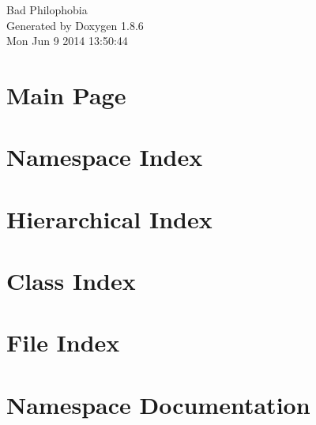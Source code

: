 \documentclass[twoside]{book}
\newcommand{\clearemptydoublepage}{%
  \newpage{\pagestyle{empty}\cleardoublepage}%
}
\begin{document}
\hypersetup{pageanchor=false}
\begin{titlepage}
\vspace*{7cm}
\begin{center}%
{\Large Bad Philophobia }\\
\vspace*{1cm}
{\large Generated by Doxygen 1.8.6}\\
\vspace*{0.5cm}
{\small Mon Jun 9 2014 13:50:44}\\
\end{center}
\end{titlepage}
\clearemptydoublepage
\tableofcontents
\clearemptydoublepage
{}
\hypersetup{pageanchor=true}

\chapter{Main Page}
\label{index}\hypertarget{index}{}
\chapter{Namespace Index}

\chapter{Hierarchical Index}

\chapter{Class Index}

\chapter{File Index}

\chapter{Namespace Documentation}







\end{document}

